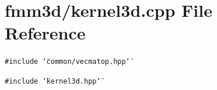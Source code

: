 \section{fmm3d/kernel3d.cpp File Reference}
\label{kernel3d_8cpp}


{\tt \#include \char`\"{}common/vecmatop.hpp\char`\"{}}\par
{\tt \#include \char`\"{}kernel3d.hpp\char`\"{}}\par
